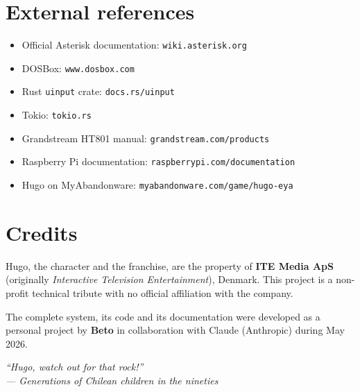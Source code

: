 \section{External references}

\begin{itemize}
  \item Official Asterisk documentation: \texttt{wiki.asterisk.org}
  \item DOSBox: \texttt{www.dosbox.com}
  \item Rust \texttt{uinput} crate: \texttt{docs.rs/uinput}
  \item Tokio: \texttt{tokio.rs}
  \item Grandstream HT801 manual: \texttt{grandstream.com/products}
  \item Raspberry Pi documentation: \texttt{raspberrypi.com/documentation}
  \item Hugo on MyAbandonware: \texttt{myabandonware.com/game/hugo-eya}
\end{itemize}

\section{Credits}

Hugo, the character and the franchise, are the property of \textbf{ITE Media ApS} (originally \emph{Interactive Television Entertainment}), Denmark. This project is a non-profit technical tribute with no official affiliation with the company.

The complete system, its code and its documentation were developed as a personal project by \textbf{Beto} in collaboration with Claude (Anthropic) during May 2026.

\vspace{1cm}

\begin{center}
\itshape\small
``Hugo, watch out for that rock!''\\
--- Generations of Chilean children in the nineties
\end{center}
